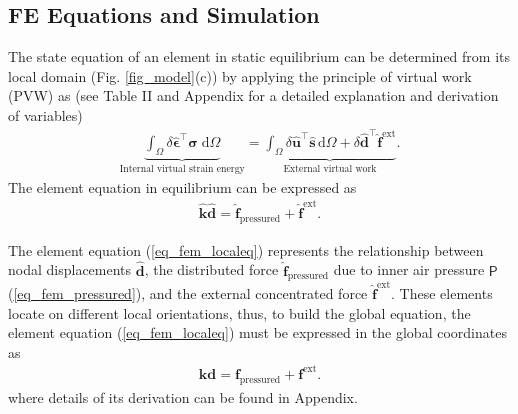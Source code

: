 \documentclass[10pt,letterpaper,journal,final,twoside,twocolumn,nofonttune]{IEEEtran}
\begin{document}
\subsection{FE Equations and Simulation}
The state equation of an element in static equilibrium can be determined from its local domain (Fig. \ref{fig_model}(c)) by applying the principle of virtual work (PVW) as (see Table II and Appendix for a detailed explanation and derivation of variables)  
\begin{align}
\label{eq_fem_pvw}
\underbrace{\int_{\Omega}\delta\hat{\bm{\epsilon}}^{\top} \hat{\bm{\sigma}}\;\mathrm{d}\Omega}_{\text{Internal virtual strain energy}} = \underbrace{\int_{\Omega} \delta \hat{\mathbf{u}}^{\top} \hat{\mathbf{s}} \, \mathrm{d}\Omega+ \delta \hat{\mathbf{d}}^{\top} \hat{\mathbf{f}}^{\text{ext}}}_{\text{External virtual work}}.
\end{align}
The element equation in equilibrium can be expressed as
\begin{equation}
\label{eq_fem_localeq}
\begin{aligned}
\hat{\mathbf{k}}\hat{\mathbf{d}} = \hat{\mathbf{f}}_{\text{pressured}} + \hat{\mathbf{f}}^{\text{ext}}.
\end{aligned}
\end{equation}

The element equation (\ref{eq_fem_localeq}) represents the relationship between nodal displacements $\hat{\mathbf{d}}$, the distributed force $\hat{\mathbf{f}}_{\text{pressured}}$ due to inner air pressure $\mathsf{P}$ (\ref{eq_fem_pressured}), and the external concentrated force $\hat{\mathbf{f}}^{\text{ext}}$.
These elements locate on different local orientations, thus, to build the global equation, the element equation (\ref{eq_fem_localeq}) must be expressed in the global coordinates as
\begin{align}
\label{eq_fem_globaleq}
\mathbf{k}\mathbf{d} = \mathbf{f}_{\text{pressured}} +\mathbf{f}^{\text{ext}}.
\end{align}
where details of its derivation can be found in Appendix.
\end{document}
